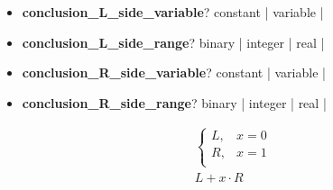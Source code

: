 \documentclass[onecolumn]{ctexart}
\begin{document}
\begin{itemize}
    \item  \textbf{conclusion_L_side_variable}?
        {\color{green} constant}  \quad  |  \quad
        {\color{green} variable}  \quad  |  \quad

    \item  \textbf{conclusion_L_side_range}? \qquad
        {\color{green} binary}   \quad  |  \quad
        {\color{green} integer}  \quad  |  \quad
        {\color{green} real}     \quad  |  \quad

    \item  \textbf{conclusion_R_side_variable}?
        {\color{green} constant}  \quad  |  \quad
        {\color{green} variable}  \quad  |  \quad

    \item  \textbf{conclusion_R_side_range}? \qquad
        {\color{green} binary}   \quad  |  \quad
        {\color{green} integer}  \quad  |  \quad
        {\color{green} real}     \quad  |  \quad

\end{itemize}


\begin{equation}
    \begin{aligned}
        &
        \begin{cases}
            L,  & x = 0  \\
            R,  & x = 1  \\
        \end{cases}
        \\
        &
        L + x \cdot R
    \end{aligned}
\end{equation}


\begin{equation}
    \begin{aligned}
    \end{aligned}
\end{equation}


\begin{equation}
    \begin{aligned}
    \end{aligned}
\end{equation}


\begin{equation}
    \begin{aligned}
    \end{aligned}
\end{equation}


\begin{equation}
    \begin{aligned}
    \end{aligned}
\end{equation}
\end{document}
